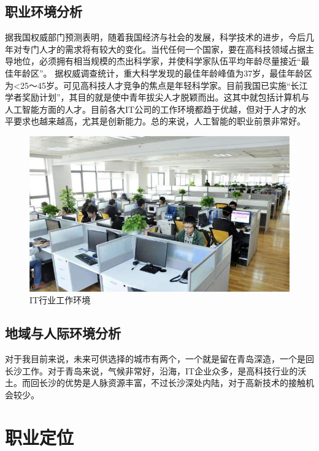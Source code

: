 \documentclass{article}
\begin{document}
\subsection{职业环境分析}
据我国权威部门预测表明，随着我国经济与社会的发展，科学技术的进步，今后几年对专门人才的需求将有较大的变化。当代任何一个国家，要在高科技领域占据主导地位，必须拥有相当规模的杰出科学家，并使科学家队伍平均年龄尽量接近“最佳年龄区”。 据权威调查统计，重大科学发现的最佳年龄峰值为37岁，最佳年龄区为<25～45岁。可见高科技人才竞争的焦点是年轻科学家。目前我国已实施“长江学者奖励计划”，其目的就是使中青年拔尖人才脱颖而出。这其中就包括计算机与人工智能方面的人才。目前各大IT公司的工作环境都趋于优越，但对于人才的水平要求也越来越高，尤其是创新能力。总的来说，人工智能的职业前景非常好。\par
\newpage
\begin{figure}[h!]
	\centering
	\includegraphics[scale=0.7]{it.png}
	\caption{IT行业工作环境}
	\label{fig:sss}
\end{figure}


\subsection{地域与人际环境分析}
对于我目前来说，未来可供选择的城市有两个，一个就是留在青岛深造，一个是回长沙工作。对于青岛来说，气候非常好，沿海，IT企业众多，是高科技行业的沃土。而回长沙的优势是人脉资源丰富，不过长沙深处内陆，对于高新技术的接触机会较少。\par
\par 




\section{职业定位}
\end{document}

